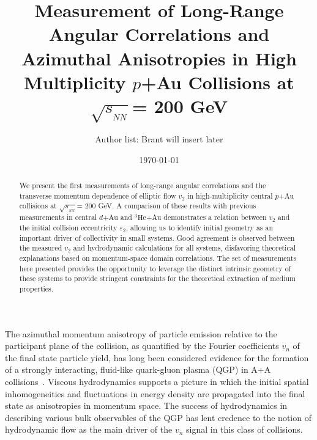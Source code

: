 \documentclass[%
reprint,
showpacs,preprintnumbers,
 amsmath,amssymb,
 aps,
]{revtex4-1}
\newcommand{\sqsn}{\mbox{$\sqrt{s_{_{NN}}}$}\xspace}
\newcommand{\dau}{\mbox{$d$+Au}\xspace}
\newcommand{\pau}{\mbox{$p$+Au}\xspace}
\newcommand{\hau}{\mbox{$^3\text{He}$+Au}\xspace}
\begin{document}
\title{Measurement of Long-Range Angular Correlations and Azimuthal Anisotropies in High Multiplicity \pau Collisions at \sqsn = 200 GeV}%

\author{Author list: Brant will insert later}

\date{\today}%

\begin{abstract}
We present the first measurements of long-range angular correlations and the transverse momentum dependence of elliptic flow $v_2$ in high-multiplicity central \pau collisions at \sqsn = 200 GeV. A comparison of these results with previous measurements in central \dau and \hau demonstrates a relation between $v_2$ and the initial collision eccentricity $\varepsilon_2$, allowing us to identify initial geometry as an important driver of collectivity in small systems. Good agreement is observed between the measured $v_2$ and hydrodynamic calculations for all systems, disfavoring theoretical explanations based on momentum-space domain correlations. The set of measurements here presented provides the opportunity to leverage the distinct intrinsic geometry of these systems to provide stringent constraints for the theoretical extraction of medium properties. 
\end{abstract}

\maketitle

The azimuthal momentum anisotropy of particle emission relative to the participant plane of the collision, as quantified by the Fourier coefficients $v_n$ of the final state particle yield, has long been considered evidence for the formation of a strongly interacting, fluid-like quark-gluon plasma (QGP) in A+A collisions~\cite{Heinz:2013th}. Viscous hydrodynamics supports a picture in which the initial spatial inhomogeneities and fluctuations in energy density are propagated into the final state as anisotropies in momentum space.  The success of hydrodynamics in describing various bulk observables of the QGP has lent credence to the notion of hydrodynamic flow as the main driver of the $v_{n}$ signal in this class of collisions.
\end{document}
